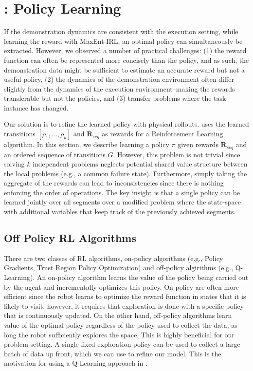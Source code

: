 \section{\hirl: Policy Learning}
If the demonstration dynamics are consistent with the execution setting, while learning the reward with MaxEnt-IRL, an optimal policy can simultaneously be extracted. However, we observed a number of practical challenges: (1) the reward function can often be represented more concisely than the policy, and as such, the demonstration data might be sufficient to estimate an accurate reward but not a useful policy, (2) the dynamics of the demonstration environment often differ slightly from the dynamics of the execution environment--making the rewards transferable but not the policies, and (3) transfer problems where the task instance has changed. 

Our solution is to refine the learned policy with physical rollouts. \hirl uses the learned transitions $[\rho_1,...,\rho_k]$ and $\mathbf{R}_{seq}$ as rewards for a Reinforcement Learning algorithm. In this section, we describe learning a policy $\pi$ given rewards $\mathbf{R}_{seq}$ and an ordered sequence of transitions $G$.
However, this problem is not trivial since solving $k$ independent problems neglects potential shared value structure between the local problems (e.g., a common failure state).
Furthermore, simply taking the aggregate of the rewards can lead to inconsistencies since there is nothing enforcing the order of operations.
The key insight is that a single policy can be learned jointly over all segments over a modified problem where the state-space with additional variables that keep track of the previously achieved segments.

\subsection{Off Policy RL Algorithms}
There are two classes of RL algorithms, on-policy algorithms (e.g., Policy Gradients, Trust Region Policy Optimization) and off-policy algirithms (e.g., Q-Learning). An on-policy algorithm learns the value of the policy being carried out by the agent and incrementally optimizes this policy. On policy are often more efficient since the robot learns to optimize the reward function in states that it is likely to visit, however, it requires that exploration is done with a specific policy that is continuously updated.
On the other hand, off-policy algorithms learn value of the optimal policy regardless of the policy used to collect the data, as long the robot sufficiently explores the space.
This is highly beneficial for our problem setting.
A single fixed exploration policy can be used to collect a large batch of data up front, which we can use to refine our model.
This is the motivation for using a Q-Learning approach in \hirl.

